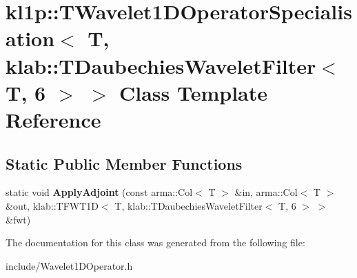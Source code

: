 \hypertarget{classkl1p_1_1TWavelet1DOperatorSpecialisation_3_01T_00_01klab_1_1TDaubechiesWaveletFilter_3_01T_00_016_01_4_01_4}{}\section{kl1p\+:\+:T\+Wavelet1\+D\+Operator\+Specialisation$<$ T, klab\+:\+:T\+Daubechies\+Wavelet\+Filter$<$ T, 6 $>$ $>$ Class Template Reference}
\label{classkl1p_1_1TWavelet1DOperatorSpecialisation_3_01T_00_01klab_1_1TDaubechiesWaveletFilter_3_01T_00_016_01_4_01_4}
\subsection*{Static Public Member Functions}
\begin{DoxyCompactItemize}
\item 
static void {\bfseries Apply\+Adjoint} (const arma\+::\+Col$<$ T $>$ \&in, arma\+::\+Col$<$ T $>$ \&out, klab\+::\+T\+F\+W\+T1D$<$ T, klab\+::\+T\+Daubechies\+Wavelet\+Filter$<$ T, 6 $>$ $>$ \&fwt)\hypertarget{classkl1p_1_1TWavelet1DOperatorSpecialisation_3_01T_00_01klab_1_1TDaubechiesWaveletFilter_3_01T_00_016_01_4_01_4_a82999df46a5e857e171333d4764ff10e}{}\label{classkl1p_1_1TWavelet1DOperatorSpecialisation_3_01T_00_01klab_1_1TDaubechiesWaveletFilter_3_01T_00_016_01_4_01_4_a82999df46a5e857e171333d4764ff10e}

\end{DoxyCompactItemize}


The documentation for this class was generated from the following file\+:\begin{DoxyCompactItemize}
\item 
include/Wavelet1\+D\+Operator.\+h\end{DoxyCompactItemize}
